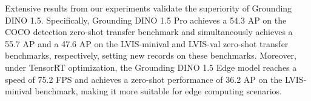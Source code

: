 Extensive results from our experiments validate the superiority of Grounding DINO 1.5.
Specifically, Grounding DINO 1.5 Pro achieves a 54.3 AP on the COCO detection zero-shot transfer benchmark and simultaneously achieves a 55.7 AP and a 47.6 AP on the LVIS-minival and LVIS-val zero-shot transfer benchmarks, respectively, setting new records on these benchmarks. Moreover, under TensorRT optimization, the Grounding DINO 1.5 Edge model reaches a speed of 75.2 FPS and achieves a zero-shot performance of 36.2 AP on the LVIS-minival benchmark, making it more suitable for edge computing scenarios.


